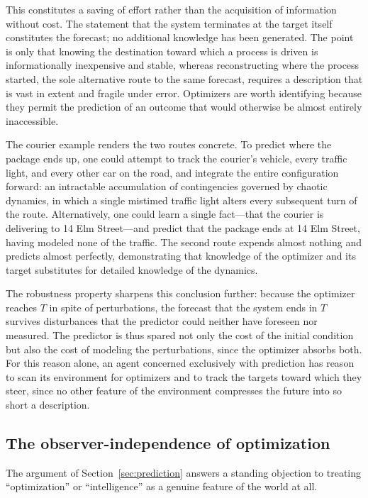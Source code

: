 \documentclass[10pt]{article}
\theoremstyle{definition}
\theoremstyle{remark}
\begin{document}
This constitutes a saving of effort rather than the acquisition of information without cost. The statement that the system terminates at the target itself constitutes the forecast; no additional knowledge has been generated. The point is only that knowing the destination toward which a process is driven is informationally inexpensive and stable, whereas reconstructing where the process started, the sole alternative route to the same forecast, requires a description that is vast in extent and fragile under error. Optimizers are worth identifying because they permit the prediction of an outcome that would otherwise be almost entirely inaccessible.

The courier example renders the two routes concrete. To predict where the package ends up, one could attempt to track the courier's vehicle, every traffic light, and every other car on the road, and integrate the entire configuration forward: an intractable accumulation of contingencies governed by chaotic dynamics, in which a single mistimed traffic light alters every subsequent turn of the route. Alternatively, one could learn a single fact---that the courier is delivering to 14 Elm Street---and predict that the package ends at 14 Elm Street, having modeled none of the traffic. The second route expends almost nothing and predicts almost perfectly, demonstrating that knowledge of the optimizer and its target substitutes for detailed knowledge of the dynamics.

The robustness property sharpens this conclusion further: because the optimizer reaches $T$ in spite of perturbations, the forecast that the system ends in $T$ survives disturbances that the predictor could neither have foreseen nor measured. The predictor is thus spared not only the cost of the initial condition but also the cost of modeling the perturbations, since the optimizer absorbs both. For this reason alone, an agent concerned exclusively with prediction has reason to scan its environment for optimizers and to track the targets toward which they steer, since no other feature of the environment compresses the future into so short a description.

\subsection{The observer-independence of optimization}
\label{sec:objective}

The argument of Section~\ref{sec:prediction} answers a standing objection to treating ``optimization'' or ``intelligence'' as a genuine feature of the world at all.
\end{document}
